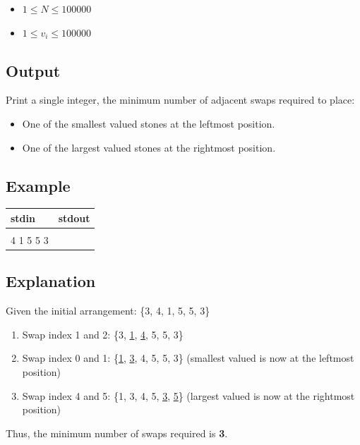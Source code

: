 \documentclass[12pt,a4paper]{article}
\begin{document}
\begin{itemize}
    \item $1 \leq N \leq 100000$
    \item $1 \leq v_i \leq 100000$
\end{itemize}

\subsection*{\fontsize{16}{12}Output}
Print a single integer, the minimum number of adjacent swaps required to place:
\begin{itemize}
    \item One of the smallest valued stones at the leftmost position.
    \item One of the largest valued stones at the rightmost position.
\end{itemize}

\newpage
\subsection*{\fontsize{16}{12}Example}
\begin{table}[h]
  \centering
  \begin{tabularx}{\textwidth}{|>{\ttfamily}X|>{\ttfamily}X|}
  \hline
  stdin & stdout \\
  \hline
    6 & 3 \\
    3 4 1 5 5 3 & \\
  \hline
  \end{tabularx}
\end{table}

\subsection*{\fontsize{16}{12}Explanation}
Given the initial arrangement: \{3, 4, 1, 5, 5, 3\}

\begin{enumerate}
    \item Swap index 1 and 2: \{3, \underline{1}, \underline{4}, 5, 5, 3\}
    \item Swap index 0 and 1: \{\underline{1}, \underline{3}, 4, 5, 5, 3\} (smallest valued is now at the leftmost position)
    \item Swap index 4 and 5: \{1, 3, 4, 5, \underline{3}, \underline{5}\} (largest valued is now at the rightmost position)
\end{enumerate}
Thus, the minimum number of swaps required is \textbf{3}.
\newpage
\end{document}
